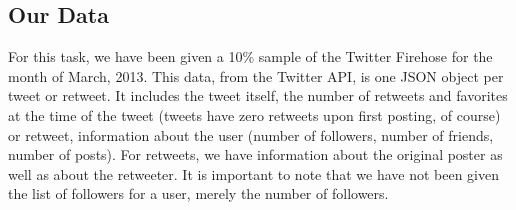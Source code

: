\subsection{Our Data}

For this task, we have been given a 10\% sample of the Twitter Firehose for the month of March, 2013.  
This data, from the Twitter API, is one JSON object per tweet or retweet.
It includes the tweet itself, the number of retweets and favorites at the time of the tweet (tweets have zero retweets upon first posting, of course) or retweet, information about the user (number of followers, number of friends, number of posts).  
For retweets, we have information about the original poster as well as about the retweeter.  
It is important to note that we have not been given the list of followers for a user, merely the number of followers.

